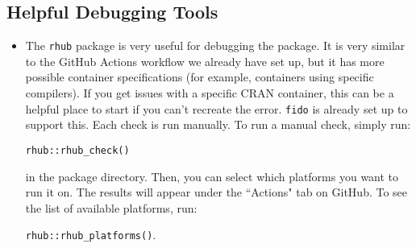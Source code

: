 \documentclass{article}
\begin{document}
\subsection*{Helpful Debugging Tools}

\begin{itemize}
    \item The \texttt{rhub} package is very useful for debugging the package. It is very similar to the GitHub Actions workflow we already have set up, but it has more possible container specifications (for example, containers using specific compilers). If you get issues with a specific CRAN container, this can be a helpful place to start if you can't recreate the error. \texttt{fido} is already set up to support this. Each check is run manually. To run a manual check, simply run:

    \texttt{rhub::rhub\_check()}

    in the package directory. Then, you can select which platforms you want to run it on. The results will appear under the ``Actions" tab on GitHub. To see the list of available platforms, run:

    \texttt{rhub::rhub\_platforms()}.

\end{itemize}
\end{document}
